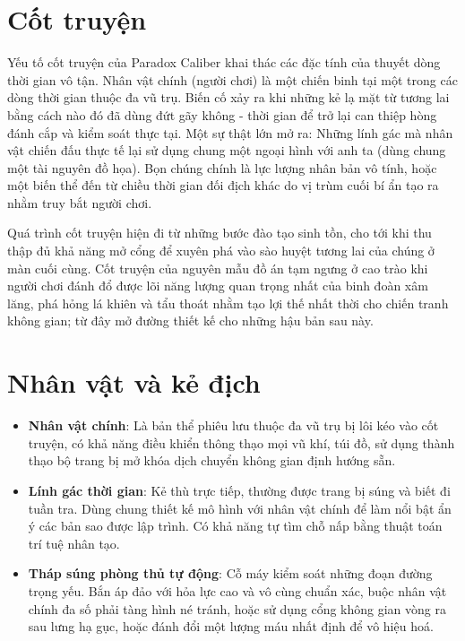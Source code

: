 \documentclass[../DoAn.tex]{subfiles}
\begin{document}
\section{Cốt truyện}
Yếu tố cốt truyện của Paradox Caliber khai thác các đặc tính của thuyết dòng thời gian vô tận. Nhân vật chính (người chơi) là một chiến binh tại một trong các dòng thời gian thuộc đa vũ trụ. Biến cố xảy ra khi những kẻ lạ mặt từ tương lai bằng cách nào đó đã dùng đứt gãy không - thời gian để trở lại can thiệp hòng đánh cắp và kiểm soát thực tại. Một sự thật lớn mở ra: Những lính gác mà nhân vật chiến đấu thực tế lại sử dụng chung một ngoại hình với anh ta (dùng chung một tài nguyên đồ họa). Bọn chúng chính là lực lượng nhân bản vô tính, hoặc một biến thể đến từ chiều thời gian đối địch khác do vị trùm cuối bí ẩn tạo ra nhằm truy bắt người chơi.

Quá trình cốt truyện hiện đi từ những bước đào tạo sinh tồn, cho tới khi thu thập đủ khả năng mở cổng để xuyên phá vào sào huyệt tương lai của chúng ở màn cuối cùng. Cốt truyện của nguyên mẫu đồ án tạm ngưng ở cao trào khi người chơi đánh đổ được lõi năng lượng quan trọng nhất của binh đoàn xâm lăng, phá hỏng lá khiên và tẩu thoát nhằm tạo lợi thế nhất thời cho chiến tranh không gian; từ đây mở đường thiết kế cho những hậu bản sau này.

\section{Nhân vật và kẻ địch}
\begin{itemize}
    \item \textbf{Nhân vật chính}: Là bản thể phiêu lưu thuộc đa vũ trụ bị lôi kéo vào cốt truyện, có khả năng điều khiển thông thạo mọi vũ khí, túi đồ, sử dụng thành thạo bộ trang bị mở khóa dịch chuyển không gian định hướng sẵn.
    \item \textbf{Lính gác thời gian}: Kẻ thù trực tiếp, thường được trang bị súng và biết đi tuần tra. Dùng chung thiết kế mô hình với nhân vật chính để làm nổi bật ẩn ý các bản sao được lập trình. Có khả năng tự tìm chỗ nấp bằng thuật toán trí tuệ nhân tạo.
    \item \textbf{Tháp súng phòng thủ tự động}: Cỗ máy kiểm soát những đoạn đường trọng yếu. Bắn áp đảo với hỏa lực cao và vô cùng chuẩn xác, buộc nhân vật chính đa số phải tàng hình né tránh, hoặc sử dụng cổng không gian vòng ra sau lưng hạ gục, hoặc đánh đổi một lượng máu nhất định để vô hiệu hoá.
\end{itemize}
\end{document}
